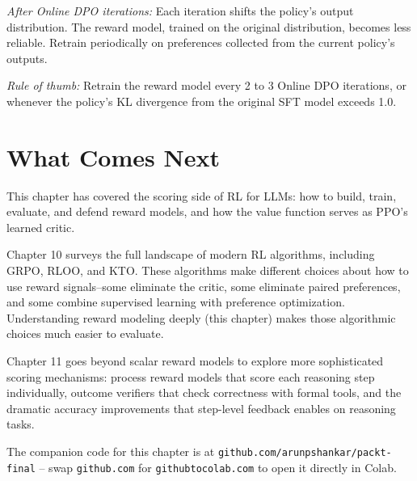 \begin{chapterenv}
\begin{infobox}
\textit{After Online DPO iterations:} Each iteration shifts the policy's output distribution. The reward model, trained on the original distribution, becomes less reliable. Retrain periodically on preferences collected from the current policy's outputs.

\textit{Rule of thumb:} Retrain the reward model every 2 to 3 Online DPO iterations, or whenever the policy's KL divergence from the original SFT model exceeds 1.0.
\end{infobox}

\section{What Comes Next}

This chapter has covered the scoring side of RL for LLMs: how to build, train, evaluate, and defend reward models, and how the value function serves as PPO's learned critic.

Chapter 10 surveys the full landscape of modern RL algorithms, including GRPO, RLOO, and KTO. These algorithms make different choices about how to use reward signals--some eliminate the critic, some eliminate paired preferences, and some combine supervised learning with preference optimization. Understanding reward modeling deeply (this chapter) makes those algorithmic choices much easier to evaluate.

Chapter 11 goes beyond scalar reward models to explore more sophisticated scoring mechanisms: process reward models that score each reasoning step individually, outcome verifiers that check correctness with formal tools, and the dramatic accuracy improvements that step-level feedback enables on reasoning tasks.


The companion code for this chapter is at \texttt{github.com/arunpshankar/packt-final} -- swap \texttt{github.com} for \texttt{githubtocolab.com} to open it directly in Colab.

\end{chapterenv}